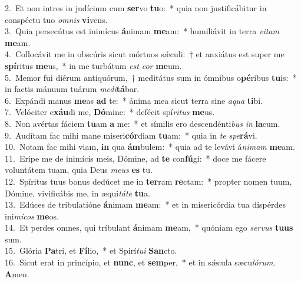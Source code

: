 {2.~}Et non intres in judícium cum \textbf{ser}vo \textbf{tu}o:~* quia non justificábitur in conspéctu tuo \textit{om}\textit{nis} \textbf{vi}vens.\\
{3.~}Quia persecútus est inimícus \textbf{á}nimam \textbf{me}am:~* humiliávit in terra \textit{vi}\textit{tam} \textbf{me}am.\\
{4.~}Collocávit me in obscúris sicut mórtuos sǽculi:~† et anxiátus est super me \textbf{spí}ritus \textbf{me}us,~* in me turbátum \textit{est} \textit{cor} \textbf{me}um.\\
{5.~}Memor fui diérum antiquórum,~† meditátus sum in ómnibus o\textbf{pé}ribus \textbf{tu}is:~* in factis mánuum tuárum \textit{me}\textit{di}\textbf{tá}bar.\\
{6.~}Expándi manus \textbf{me}as \textbf{ad} te:~* ánima mea sicut terra sine \textit{a}\textit{qua} \textbf{ti}bi.\\
{7.~}Velóciter e\textbf{xáu}di me, \textbf{Dó}mine:~* defécit spí\textit{ri}\textit{tus} \textbf{me}us.\\
{8.~}Non avértas fáciem \textbf{tu}am \textbf{a} me:~* et símilis ero descendénti\textit{bus} \textit{in} \textbf{la}cum.\\
{9.~}Audítam fac mihi mane miseri\textbf{cór}diam \textbf{tu}am:~* quia in \textit{te} \textit{spe}\textbf{rá}vi.\\
{10.~}Notam fac mihi viam, \textbf{in} qua \textbf{ám}bulem:~* quia ad te levávi á\textit{ni}\textit{mam} \textbf{me}am.\\
{11.~}Eripe me de inimícis meis, Dómine, ad \textbf{te} con\textbf{fú}gi:~* doce me fácere voluntátem tuam, quia Deus \textit{me}\textit{us} \textbf{es} tu.\\
{12.~}Spíritus tuus bonus dedúcet me in \textbf{ter}ram \textbf{re}ctam:~* propter nomen tuum, Dómine, vivificábis me, in æqui\textit{tá}\textit{te} \textbf{tu}a.\\
{13.~}Edúces de tribulatióne \textbf{á}nimam \textbf{me}am:~* et in misericórdia tua dispérdes ini\textit{mí}\textit{cos} \textbf{me}os.\\
{14.~}Et perdes omnes, qui tríbulant \textbf{á}nimam \textbf{me}am,~* quóniam ego \textit{ser}\textit{vus} \textbf{tu}\textbf{us} sum.\\
{15.~}Glória \textbf{Pa}tri, et \textbf{Fí}lio,~* et Spirí\textit{tu}\textit{i} \textbf{San}cto.\\
{16.~}Sicut erat in princípio, et \textbf{nunc}, et \textbf{sem}per,~* et in sǽcula sæcu\textit{ló}\textit{rum}. \textbf{A}men.\\
